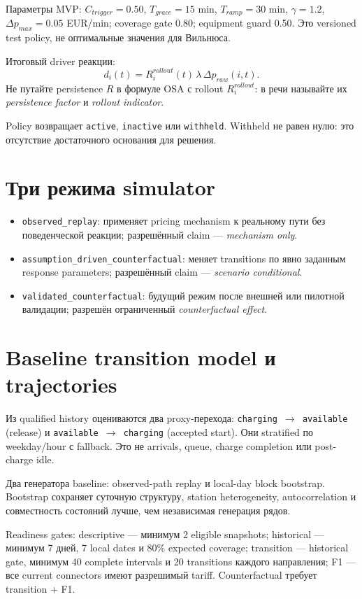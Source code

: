 \documentclass[11pt,a4paper]{article}
\newcommand{\code}[1]{\texttt{#1}}
\begin{document}
Параметры MVP: $C_{trigger}=0.50$, $T_{grace}=15$ min, $T_{ramp}=30$ min, $\gamma=1.2$, $\Delta p_{max}=0.05$ EUR/min; coverage gate 0.80; equipment guard 0.50. Это versioned test policy, не оптимальные значения для Вильнюса.

Итоговый driver реакции:
\[
d_i(t)=R_i^{rollout}(t)\,\lambda\,\Delta p_{raw}(i,t).
\]
Не путайте persistence $R$ в формуле OSA с rollout $R_i^{rollout}$: в речи называйте их \emph{persistence factor} и \emph{rollout indicator}.

Policy возвращает \code{active}, \code{inactive} или \code{withheld}. Withheld не равен нулю: это отсутствие достаточного основания для решения.

\section{Три режима simulator}
\begin{itemize}
\item \code{observed\_replay}: применяет pricing mechanism к реальному пути без поведенческой реакции; разрешённый claim --- \emph{mechanism only}.
\item \code{assumption\_driven\_counterfactual}: меняет transitions по явно заданным response parameters; разрешённый claim --- \emph{scenario conditional}.
\item \code{validated\_counterfactual}: будущий режим после внешней или пилотной валидации; разрешён ограниченный \emph{counterfactual effect}.
\end{itemize}

\section{Baseline transition model и trajectories}
Из qualified history оцениваются два proxy-перехода: \code{charging $\to$ available} (release) и \code{available $\to$ charging} (accepted start). Они stratified по weekday/hour с fallback. Это не arrivals, queue, charge completion или post-charge idle.

Два генератора baseline: observed-path replay и local-day block bootstrap. Bootstrap сохраняет суточную структуру, station heterogeneity, autocorrelation и совместность состояний лучше, чем независимая генерация рядов.

Readiness gates: descriptive --- минимум 2 eligible snapshots; historical --- минимум 7 дней, 7 local dates и 80\% expected coverage; transition --- historical gate, минимум 40 complete intervals и 20 transitions каждого направления; F1 --- все current connectors имеют разрешимый tariff. Counterfactual требует transition + F1.
\end{document}
